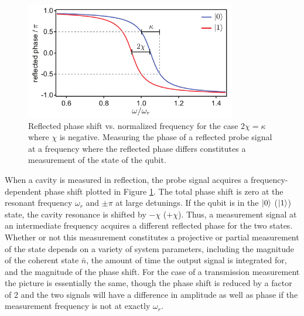 \begin{figure}
\begin{center}
	\includegraphics[width = 3.64in]{scqb_chapter/ref_phi}
\end{center}
\caption[Dispersive phase shift in reflection]{Reflected phase shift vs. normalized frequency for the case $2 \chi = \kappa$ where $\chi$ is negative.  Measuring the phase of a reflected probe signal at a frequency where the reflected phase differs constitutes a measurement of the state of the qubit.}
\label{fig:ref_phi}
\end{figure}

When a cavity is measured in reflection, the probe signal acquires a frequency-dependent phase shift plotted in Figure \ref{fig:ref_phi}.  The total phase shift is zero at the resonant frequency $\omega_r$ and $\pm \pi$ at large detunings.  If the qubit is in the $|0\rangle$ ($|1\rangle$) state, the cavity resonance is shifted by $-\chi$ ($+\chi$).  Thus, a measurement signal at an intermediate frequency acquires a different reflected phase for the two states.  Whether or not this measurement constitutes a projective or partial measurement of the state depends on a variety of system parameters, including the magnitude of the coherent state $\bar{n}$, the amount of time the output signal is integrated for, and the magnitude of the phase shift.  For the case of a transmission measurement the picture is essentially the same, though the phase shift is reduced by a factor of 2 and the two signals will have a difference in amplitude as well as phase if the measurement frequency is not at exactly $\omega_r$.

